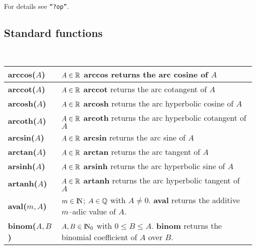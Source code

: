 \leer\leer
For details see {\tt ``?op''}.

\newpage

\subsection{Standard functions}

{\ }
{

\begin{tabular}{|p{1.95in}|p{3.83in}|} \hline

{\bf arccos($A$)} &
$A \in \mbox{$\mathbb R$}$\newline
{\bf arccos} returns the arc cosine of $A$ \\ \hline

{\bf arccot($A$)} &
$A \in \mbox{$\mathbb R$}$\newline
{\bf arccot} returns the arc cotangent of $A$ \\ \hline

{\bf arcosh($A$)} &
$A \in \mbox{$\mathbb R$}$\newline
{\bf arcosh} returns the arc hyperbolic cosine of $A$ \\ \hline

{\bf arcoth($A$)} &
$A \in \mbox{$\mathbb R$}$\newline
{\bf arcoth} returns the arc hyperbolic cotangent of $A$ \\ \hline

{\bf arcsin($A$)} &
$A \in \mbox{$\mathbb R$}$\newline
{\bf arcsin} returns the arc sine of $A$ \\ \hline

{\bf arctan($A$)} &
$A \in \mbox{$\mathbb R$}$\newline
{\bf arctan} returns the arc tangent of $A$ \\ \hline

{\bf arsinh($A$)} &
$A \in \mbox{$\mathbb R$}$\newline
{\bf arsinh} returns the arc hyperbolic sine of $A$ \\ \hline

{\bf artanh($A$)} &
$A \in \mbox{$\mathbb R$}$\newline
{\bf artanh} returns the arc hyperbolic tangent of $A$ \\ \hline

{\bf aval($m,A$)} &
$m \in {\rm{I\!N}}$; $A \in \mbox{$\mathbb Q$}$ with $A \neq 0$.\newline
{\bf aval} returns the additive $m$--adic value of $A$. \\ \hline

{\bf binom($A,B$)} &
$A,B \in {\rm{I\!N}}_0$ with $0 \leq B \leq A$.\newline
{\bf binom} returns the binomial coefficient of $A$ over $B$.\\ \hline


\end{tabular}}
